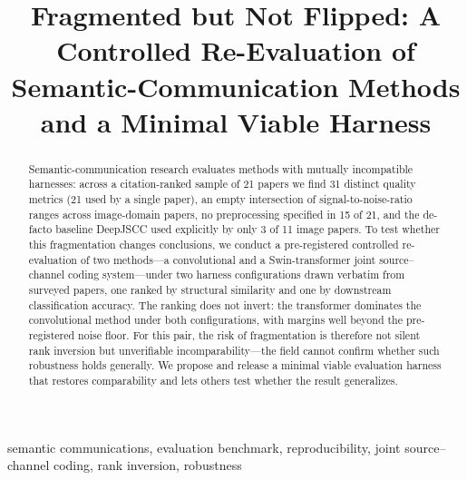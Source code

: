 \documentclass[conference]{IEEEtran}
\begin{document}
\title{Fragmented but Not Flipped: A Controlled Re-Evaluation of
Semantic-Communication Methods and a Minimal Viable Harness}

\author{
\and
{}
}

\maketitle

\begin{abstract}
Semantic-communication research evaluates methods with mutually incompatible harnesses:
across a citation-ranked sample of 21 papers we find 31 distinct quality metrics (21 used
by a single paper), an empty intersection of signal-to-noise-ratio ranges across
image-domain papers, no preprocessing specified in 15 of 21, and the de-facto baseline
DeepJSCC used explicitly by only 3 of 11 image papers. To test whether this fragmentation
changes conclusions, we conduct a pre-registered controlled re-evaluation of two
methods---a convolutional and a Swin-transformer joint source--channel coding system---under
two harness configurations drawn verbatim from surveyed papers, one ranked by structural
similarity and one by downstream classification accuracy. The ranking does not invert: the
transformer dominates the convolutional method under both configurations, with margins well
beyond the pre-registered noise floor. For this pair, the risk of fragmentation is therefore
not silent rank inversion but unverifiable incomparability---the field cannot confirm whether
such robustness holds generally. We propose and release a minimal viable evaluation harness
that restores comparability and lets others test whether the result generalizes.
\end{abstract}

\begin{IEEEkeywords}
semantic communications, evaluation benchmark, reproducibility,
joint source--channel coding, rank inversion, robustness
\end{IEEEkeywords}
\end{document}
